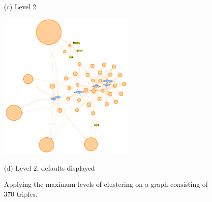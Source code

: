\begin{figure}[htb]
\begin{minipage}[b]{0.48\linewidth}
  \centerline{(c) Level 2}\medskip
\end{minipage}
\hfill
\begin{minipage}[b]{0.48\linewidth}
  \centering
  \centerline{\includegraphics[width=6.7cm]{img/cluster2_with_defaults.png}}
  \centerline{(d) Level 2, defaults displayed}\medskip
\end{minipage}
\caption{Applying the maximum levels of clustering on a graph consisting of 370 triples.}
\label{img:clusters}
\end{figure}












